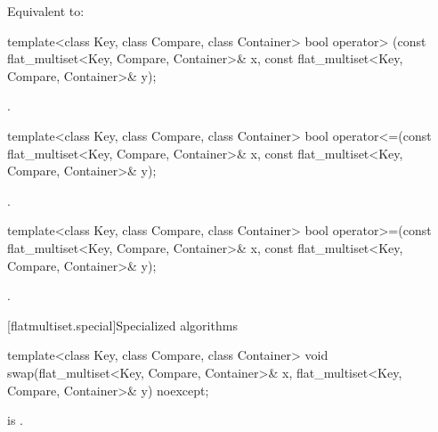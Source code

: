 \begin{codeblock}
\begin{codeblock}
\begin{codeblock}
\begin{addedblock}
\begin{itemdescr}
\pnum
\effects Equivalent to:
\end{itemdescr}

%
\begin{itemdecl}
template<class Key, class Compare, class Container>
  bool operator> (const flat_multiset<Key, Compare, Container>& x,
                  const flat_multiset<Key, Compare, Container>& y);
\end{itemdecl}

\begin{itemdescr}
\pnum \returns {}.
\end{itemdescr}

%
\begin{itemdecl}
template<class Key, class Compare, class Container>
  bool operator<=(const flat_multiset<Key, Compare, Container>& x,
                  const flat_multiset<Key, Compare, Container>& y);
\end{itemdecl}

\begin{itemdescr}
\pnum \returns {}.
\end{itemdescr}

%
\begin{itemdecl}
template<class Key, class Compare, class Container>
  bool operator>=(const flat_multiset<Key, Compare, Container>& x,
                  const flat_multiset<Key, Compare, Container>& y);
\end{itemdecl}

\begin{itemdescr}
\pnum \returns {}.
\end{itemdescr}

[flatmultiset.special]{Specialized algorithms}

%
\begin{itemdecl}
template<class Key, class Compare, class Container>
  void swap(flat_multiset<Key, Compare, Container>& x,
            flat_multiset<Key, Compare, Container>& y) noexcept;
\end{itemdecl}

\begin{itemdescr}
\pnum \constraints {} is .


\end{itemdescr}
\end{addedblock}
\end{codeblock}
\end{codeblock}
\end{codeblock}
